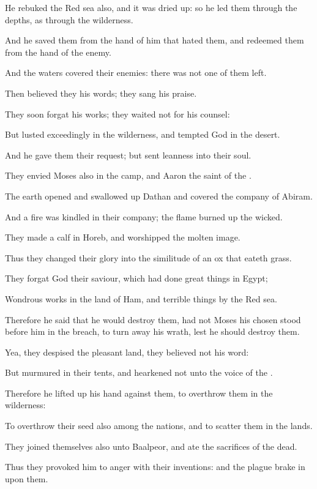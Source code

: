 \verse He rebuked the Red sea also, and it was dried up: so he led them through the depths, as through the wilderness.

\verse And he saved them from the hand of him that hated them, and redeemed them from the hand of the enemy.

\verse And the waters covered their enemies: there was not one of them left.

\verse Then believed they his words; they sang his praise.

\verse They soon forgat his works; they waited not for his counsel:

\verse But lusted exceedingly in the wilderness, and tempted God in the desert.

\verse And he gave them their request; but sent leanness into their soul.

\verse They envied Moses also in the camp, and Aaron the saint of the \LORD.

\verse The earth opened and swallowed up Dathan and covered the company of Abiram.

\verse And a fire was kindled in their company; the flame burned up the wicked.

\verse They made a calf in Horeb, and worshipped the molten image.

\verse Thus they changed their glory into the similitude of an ox that eateth grass.

\verse They forgat God their saviour, which had done great things in Egypt;

\verse Wondrous works in the land of Ham, and terrible things by the Red sea.

\verse Therefore he said that he would destroy them, had not Moses his chosen stood before him in the breach, to turn away his wrath, lest he should destroy them.

\verse Yea, they despised the pleasant land, they believed not his word:

\verse But murmured in their tents, and hearkened not unto the voice of the \LORD.

\verse Therefore he lifted up his hand against them, to overthrow them in the wilderness:

\verse To overthrow their seed also among the nations, and to scatter them in the lands.

\verse They joined themselves also unto Baalpeor, and ate the sacrifices of the dead.

\verse Thus they provoked him to anger with their inventions: and the plague brake in upon them.

